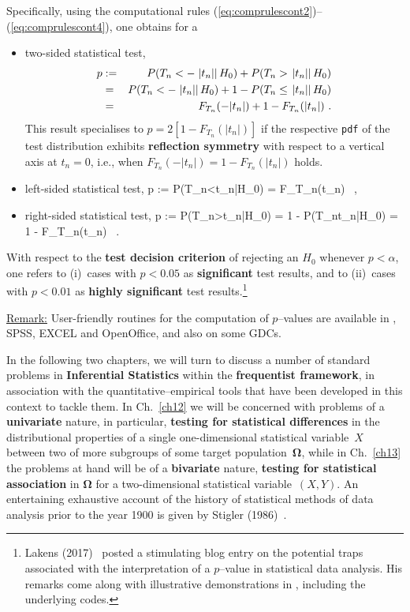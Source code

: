 \vspace{5mm}
\noindent
Specifically, using the computational rules 
(\ref{eq:comprulescont2})--(\ref{eq:comprulescont4}), one obtains 
for a
%
\begin{itemize}
\item two-sided statistical test,
%
\begin{eqnarray}
\lb{eq:pvaluetwo}
p & := & P(T_{n}<-\left.|t_{n}|\right|H_{0})
+ P(T_{n}>\left.|t_{n}|\right|H_{0}) \nonumber\\
& = & P(T_{n}<-\left.|t_{n}|\right|H_{0})
+ 1 - P(T_{n}\leq\left.|t_{n}|\right|H_{0}) \nonumber\\
& = & F_{T_{n}}(-|t_{n}|) + 1 - F_{T_{n}}(|t_{n}|) \ .
\end{eqnarray}
%
This result specialises to $p=2\left[1 - F_{T_{n}}(|t_{n}|)\right]$
if the respective \texttt{pdf} of the test distribution exhibits
\textbf{reflection symmetry} with respect to a vertical axis at
$t_{n}=0$, i.e., when 
$F_{T_{n}}(-|t_{n}|)=1 - F_{T_{n}}(|t_{n}|)$ holds.

\item left-sided statistical test,
%
\be
{}
p := P(T_{n}<t_{n}|H_{0})
= F_{T_{n}}(t_{n}) \ ,
\ee
%

\item right-sided statistical test,
%
\be
{}
p := P(T_{n}>t_{n}|H_{0})
= 1 - P(T_{n}\leq t_{n}|H_{0})
= 1 - F_{T_{n}}(t_{n}) \ .
\ee
%
\end{itemize}
%
With respect to the \textbf{test decision criterion} of rejecting 
an $H_{0}$ whenever $p < \alpha$, one refers to (i)~cases with 
$p<0.05$ as \textbf{significant} test results, and to (ii)~cases
with $p<0.01$ as \textbf{highly significant} test
results.\footnote{Lakens (2017)~ posted a stimulating
blog entry on the potential traps associated with the
interpretation of a $p$--value in statistical data analysis. His
remarks come along with illustrative demonstrations in \R{},
including the underlying codes.}

\medskip
\noindent
\underline{Remark:} User-friendly routines for the computation of 
$p$--values are available in \R{}, SPSS, EXCEL and OpenOffice, and 
also on some GDCs.

\vspace{5mm}
\noindent
In the following two chapters, we will turn to discuss a number of 
standard problems in \textbf{Inferential Statistics} within the 
\textbf{frequentist framework}, in association with the 
quantitative--empirical tools that have been developed in this
context to tackle them. In Ch.~\ref{ch12} we will be concerned with
problems of a \textbf{univariate} nature, in particular,
\textbf{testing for statistical differences} in the distributional
properties of a single one-dimensional statistical variable~$X$
between two of more subgroups of some target
population~$\boldsymbol{\Omega}$, while in Ch.~\ref{ch13} the
problems at hand will be of a \textbf{bivariate} nature,
\textbf{testing for statistical association} in
$\boldsymbol{\Omega}$ for a two-dimensional statistical
variable~$(X,Y)$. An entertaining exhaustive account of the history
of statistical methods of data analysis prior to the year 1900 is
given by Stigler (1986)~.

